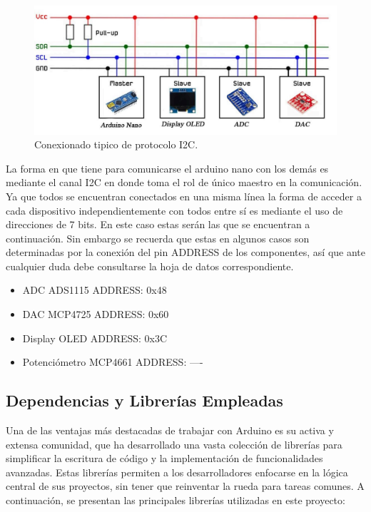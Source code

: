 \begin{figure}[H]
    \centering
    \includegraphics[scale=0.3]{./imagenes/i2cprotocol.jpg}
    \caption{Conexionado tipico de protocolo I2C.}
    \label{F:diagrama_protocolo_i2c}
\end{figure}

La forma en que tiene para comunicarse el arduino nano con los demás es mediante el canal I2C en donde toma el rol de único maestro en la comunicación. Ya que todos se encuentran conectados en una misma línea la forma de acceder a cada dispositivo independientemente con todos entre sí es mediante el uso de direcciones de 7 bits. En este caso estas serán las que se encuentran a continuación. Sin embargo se recuerda que estas en algunos casos son determinadas por la conexión del pin ADDRESS de los componentes, así que ante cualquier duda debe consultarse la hoja de datos correspondiente.
\begin{itemize}
    \item ADC ADS1115 ADDRESS: 0x48
    \item DAC MCP4725 ADDRESS: 0x60
    \item Display OLED ADDRESS: 0x3C
    \item Potenciómetro MCP4661 ADDRESS: ----
\end{itemize}

\subsection{Dependencias y Librerías Empleadas}

Una de las ventajas más destacadas de trabajar con Arduino es su activa y extensa comunidad, que ha desarrollado una vasta colección de librerías para simplificar la escritura de código y la implementación de funcionalidades avanzadas. Estas librerías permiten a los desarrolladores enfocarse en la lógica central de sus proyectos, sin tener que reinventar la rueda para tareas comunes. A continuación, se presentan las principales librerías utilizadas en este proyecto:

